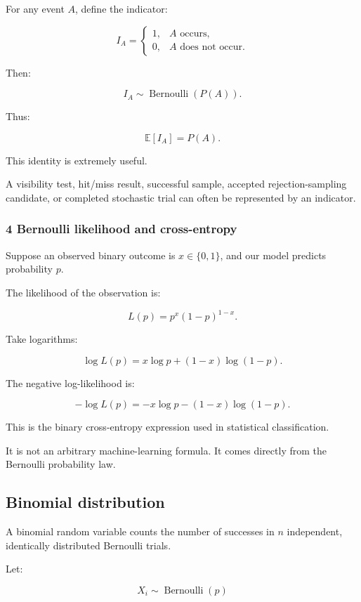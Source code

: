 For any event \(A\), define the indicator:

\[
 I_A= \begin{cases} 1,&A\text{ occurs},\\ 0,&A\text{ does not occur}. \end{cases}
\]

Then:

\[
 I_A\sim\operatorname{Bernoulli}(P(A)).
\]

Thus:

\[
 \boxed{\mathbb E[I_A]=P(A)}.
\]

This identity is extremely useful.

A visibility test, hit/miss result, successful sample, accepted rejection-sampling candidate, or completed stochastic trial can often be represented by an indicator.

\subsubsection{4 Bernoulli likelihood and cross-entropy}\label{02-foundations-ii-ch023-bernoulli-likelihood-and-cross-entropy}

Suppose an observed binary outcome is \(x\in\{0,1\}\), and our model predicts probability \(p\).

The likelihood of the observation is:

\[
 L(p)=p^x(1-p)^{1-x}.
\]

Take logarithms:

\[
 \log L(p)= x\log p+(1-x)\log(1-p).
\]

The negative log-likelihood is:

\[
 \boxed{ -\log L(p)= -x\log p-(1-x)\log(1-p) }.
\]

This is the binary cross-entropy expression used in statistical classification.

It is not an arbitrary machine-learning formula. It comes directly from the Bernoulli probability law.

\subsection{Binomial distribution}\label{02-foundations-ii-ch023-binomial-distribution}

A binomial random variable counts the number of successes in \(n\) independent, identically distributed Bernoulli trials.

Let:

\[
 X_i\sim\operatorname{Bernoulli}(p)
\]

